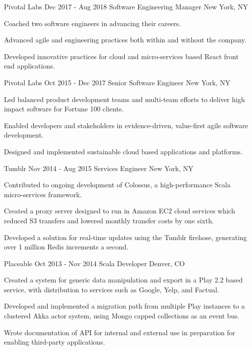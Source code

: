 \documentclass[10pt]{article}
\begin{document}
{	\job
	{Pivotal Labs}
	{Dec 2017 - Aug 2018}
	{Software Engineering Manager}
	{New York, NY}
	{
	\begin{newitemize}
		\item Coached two software engineers in advancing their careers.
		\item Advanced agile and engineering practices both within and without the company.
		\item Developed innovative practices for cloud and micro-services based React front end applications.
	\end{newitemize}
	}

	\job
	{Pivotal Labs}
	{Oct 2015 - Dec 2017}
	{Senior Software Engineer}
	{New York, NY}
	{
	\begin{newitemize}
		\item Led balanced product development teams and multi-team efforts to deliver high impact software for
		Fortune 100 clients.
		\item Enabled developers and stakeholders in evidence-driven, value-first agile software development.
		\item Designed and implemented sustainable cloud based applications and platforms.
	\end{newitemize}
	}

	\job
	{Tumblr}
	{Nov 2014 - Aug 2015}
	{Services Engineer}
	{New York, NY}
	{
	\begin{newitemize}
		\item Contributed to ongoing development of Colossus, a
	high-performance Scala micro-services
	framework.
		\item Created a proxy server designed to run in Amazon EC2 cloud
		services which reduced S3 transfers and lowered monthly transfer
		costs by one sixth.
		\item Developed a solution for real-time updates using the
		Tumblr firehose, generating over 1 million Redis increments a
		second.
	\end{newitemize}
	}

	\job
	{Placeable}
	{Oct 2013 - Nov 2014}
	{Scala Developer}
	{Denver, CO}
	{
	\begin{newitemize}
		\item Created a system for generic data manipulation and export
in a Play 2.2 based service, with distribution to services such
as Google, Yelp, and Factual.
		\item Developed and implemented a migration path from multiple
Play instances to a clustered Akka actor system, using Mongo
capped collections as an event bus.
		\item Wrote documentation of API for internal and external use
in preparation for enabling third-party applications.
	\end{newitemize}
	}

}
\end{document}
